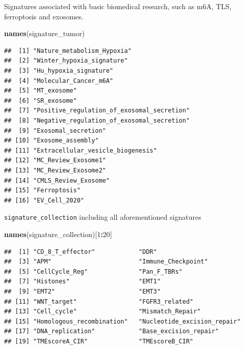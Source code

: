 \documentclass[
  12pt,
]{book}
\newenvironment{Shaded}{\begin{snugshade}}{\end{snugshade}}
\newcommand{\DecValTok}[1]{\textcolor[rgb]{0.00,0.00,0.81}{#1}}
\newcommand{\FunctionTok}[1]{\textcolor[rgb]{0.13,0.29,0.53}{\textbf{#1}}}
\newcommand{\NormalTok}[1]{#1}
\newcommand{\SpecialCharTok}[1]{\textcolor[rgb]{0.81,0.36,0.00}{\textbf{#1}}}
\begin{document}
Signatures associated with basic biomedical research, such as m6A, TLS, ferroptosis and exosomes.

\begin{Shaded}
\begin{Highlighting}[]
\FunctionTok{names}\NormalTok{(signature\_tumor)}
\end{Highlighting}
\end{Shaded}

\begin{verbatim}
##  [1] "Nature_metabolism_Hypoxia"                
##  [2] "Winter_hypoxia_signature"                 
##  [3] "Hu_hypoxia_signature"                     
##  [4] "Molecular_Cancer_m6A"                     
##  [5] "MT_exosome"                               
##  [6] "SR_exosome"                               
##  [7] "Positive_regulation_of_exosomal_secretion"
##  [8] "Negative_regulation_of_exosomal_secretion"
##  [9] "Exosomal_secretion"                       
## [10] "Exosome_assembly"                         
## [11] "Extracellular_vesicle_biogenesis"         
## [12] "MC_Review_Exosome1"                       
## [13] "MC_Review_Exosome2"                       
## [14] "CMLS_Review_Exosome"                      
## [15] "Ferroptosis"                              
## [16] "EV_Cell_2020"
\end{verbatim}

\texttt{signature\_collection} including all aforementioned signatures

\begin{Shaded}
\begin{Highlighting}[]
\FunctionTok{names}\NormalTok{(signature\_collection)[}\DecValTok{1}\SpecialCharTok{:}\DecValTok{20}\NormalTok{]}
\end{Highlighting}
\end{Shaded}

\begin{verbatim}
##  [1] "CD_8_T_effector"            "DDR"                       
##  [3] "APM"                        "Immune_Checkpoint"         
##  [5] "CellCycle_Reg"              "Pan_F_TBRs"                
##  [7] "Histones"                   "EMT1"                      
##  [9] "EMT2"                       "EMT3"                      
## [11] "WNT_target"                 "FGFR3_related"             
## [13] "Cell_cycle"                 "Mismatch_Repair"           
## [15] "Homologous_recombination"   "Nucleotide_excision_repair"
## [17] "DNA_replication"            "Base_excision_repair"      
## [19] "TMEscoreA_CIR"              "TMEscoreB_CIR"
\end{verbatim}
\end{document}
